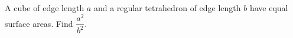 A cube of edge length $ a $ and a regular tetrahedron of edge length $ b $ have equal surface areas. Find $\dfrac{a^2}{b^2}$.
